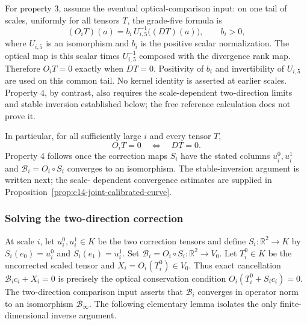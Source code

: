 For property 3, assume the eventual optical-comparison input: on one
tail of scales, uniformly for all tensors $T$, the grade-five formula is
\[
 (O_iT)(a)=b_i\,U_{i,5}^{-1}\bigl((DT)(a)\bigr),
 \qquad b_i>0,
\]
where $U_{i,5}$ is an isomorphism and
$b_i$ is the
positive scalar normalization. The optical map is this scalar times
$U_{i,5}^{-1}$ composed with the divergence rank map. Therefore $O_iT=0$
exactly when $DT=0$. Positivity of $b_i$ and invertibility of $U_{i,5}$
are used on this common tail. No kernel identity is asserted at earlier
scales. Property 4, by contrast,
also requires the scale-dependent two-direction limits and stable inversion
established below; the free reference calculation does not prove it.

In particular, for all sufficiently large $i$ and every tensor $T$,
\begin{equation}
 O_i T=0\quad\Longleftrightarrow\quad DT=0.
 \label{eq:ex-lattice-trace-kernel-comparison}
\end{equation}
Property 4 follows once the correction maps $S_i$ have the stated
columns $u_i^0,u_i^1$ and $\mathcal B_i=O_i\circ S_i$ converges to an
isomorphism. The stable-inversion argument is written next; the scale-
dependent convergence estimates are supplied in
Proposition~\ref{prop:c14-joint-calibrated-curve}.

\subsubsection{Solving the two-direction correction}

At scale $i$, let $u_i^0,u_i^1\in K$ be the two correction tensors and
define $S_i:\mathbb R^2\to K$ by $S_i(e_0)=u_i^0$ and $S_i(e_1)=u_i^1$.
Set $\mathcal B_i=O_i\circ S_i:\mathbb R^2\to V_0$. Let $T_i^0\in K$
be the uncorrected scaled tensor and $X_i=O_i(T_i^0)\in V_0$. Thus exact
cancellation $\mathcal B_i c_i+X_i=0$ is precisely the optical conservation
condition $O_i(T_i^0+S_i c_i)=0$. The two-direction comparison input
asserts that $\mathcal B_i$ converges in operator norm to an isomorphism
$\mathcal B_\infty$. The following elementary lemma
isolates the only finite-dimensional inverse argument.

